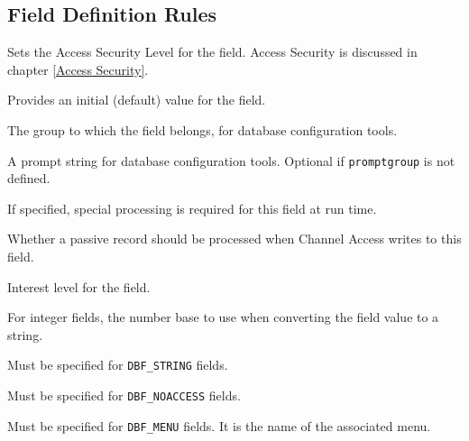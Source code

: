 \subsection{Field Definition Rules}

\begin{description}

\item [asl] Sets the Access Security Level for the field.
Access Security is discussed in chapter \ref{Access Security}.

\item [initial] Provides an initial (default) value for the field.

\item [promptgroup] The group to which the field belongs, for database configuration tools.

\item [prompt] A prompt string for database configuration tools.
Optional if \verb|promptgroup| is not defined.

\item [special] If specified, special processing is required for this field at run time.

\item [pp] Whether a passive record should be processed when Channel Access writes to this field.

\item [interest] Interest level for the field.

\item [base] For integer fields, the number base to use when converting the field value to a string.

\item [size] Must be specified for \verb|DBF_STRING| fields.

\item [extra] Must be specified for \verb|DBF_NOACCESS| fields.

\item [menu] Must be specified for \verb|DBF_MENU| fields. It is the name of the associated menu.
\end{description}


